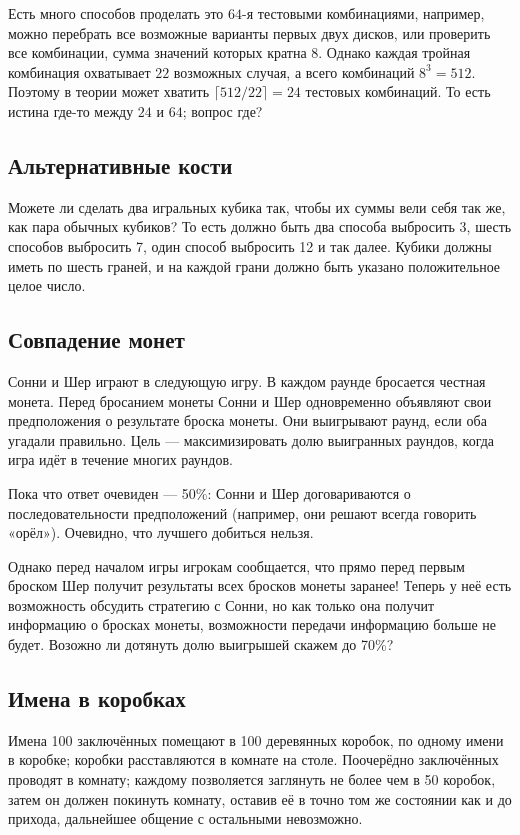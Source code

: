 Есть много способов проделать это $64$-я тестовыми комбинациями, например, можно перебрать все возможные варианты первых двух дисков, или проверить все комбинации, сумма значений которых кратна 8.
Однако каждая тройная комбинация охватывает $22$ возможных случая, а всего комбинаций $8^3 = 512$. 
Поэтому в теории может хватить $\lceil 512/22 \rceil = 24$ тестовых комбинаций.
То есть истина где-то между $24$ и $64$; вопрос где?

\subsection*{Альтернативные кости}

Можете ли сделать два игральных кубика так, чтобы их суммы вели себя так же, как пара обычных кубиков?
То есть должно быть два способа выбросить 3, шесть способов выбросить 7, один способ выбросить 12 и так далее. Кубики должны иметь по шесть граней, и на каждой грани должно быть указано положительное целое число.

\subsection*{Совпадение монет}

Сонни и Шер играют в следующую игру.
В каждом раунде бросается честная монета.
Перед бросанием монеты Сонни и Шер одновременно объявляют свои предположения о результате броска монеты.
Они выигрывают раунд, если оба угадали правильно.
Цель --- максимизировать долю выигранных раундов, когда игра идёт в течение многих раундов.

Пока что ответ очевиден --- 50\%: Сонни и Шер договариваются о последовательности предположений (например, они решают всегда говорить «орёл»).
Очевидно, что лучшего добиться нельзя.

Однако перед началом игры игрокам сообщается, что прямо перед первым броском Шер получит результаты всех бросков монеты заранее!
Теперь у неё есть возможность обсудить стратегию с Сонни, но как только она получит информацию о бросках монеты, возможности передачи информацию больше не будет.
Возожно ли дотянуть долю выигрышей скажем до 70\%?

\subsection*{Имена в коробках}

Имена 100 заключённых помещают в 100 деревянных коробок, по одному имени в коробке;
коробки расставляются в комнате на столе.
Поочерёдно заключённых проводят в комнату;
каждому позволяется заглянуть не более чем в 50 коробок,
затем он должен покинуть комнату, оставив её в точно том же состоянии как и до прихода,
дальнейшее общение с остальными невозможно.

